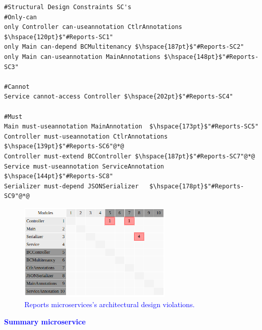 \documentclass[12pt]{article}
\begin{document}
\begin{lstlisting}[style=colorido,caption={\textcolor{blue}{Reports microservice's architectural design specification.}},label={list:especArquiteturalReports}
]
#Structural Design Constraints SC's
#Only-can
only Controller can-useannotation CtlrAnnotations $\hspace{120pt}$"#Reports-SC1"
only Main can-depend BCMultitenancy $\hspace{187pt}$"#Reports-SC2"
only Main can-useannotation MainAnnotations $\hspace{148pt}$"#Reports-SC3"

#Cannot
Service cannot-access Controller $\hspace{202pt}$"#Reports-SC4"

#Must	
Main must-useannotation MainAnnotation  $\hspace{173pt}$"#Reports-SC5"
Controller must-useannotation CtlrAnnotations $\hspace{139pt}$"#Reports-SC6"@*@
Controller must-extend BCController	$\hspace{187pt}$"#Reports-SC7"@*@
Service must-useannotation ServiceAnnotation $\hspace{144pt}$"#Reports-SC8"
Serializer must-depend JSONSerializer	$\hspace{178pt}$"#Reports-SC9"@*@

\end{lstlisting}
\begin{figure}[ht]
\centering
\includegraphics[width=0.65\textwidth]{figuras/violacoesReports.png}
\caption{\textcolor{blue}{Reports microservices's architectural design violations.}}
\label{fig:microservices}
\end{figure}

\newpage
\noindent\textbf{\large{\textcolor{blue}{Summary microservice}}}
\label{sec:ApendiceSummary}
\end{document}

